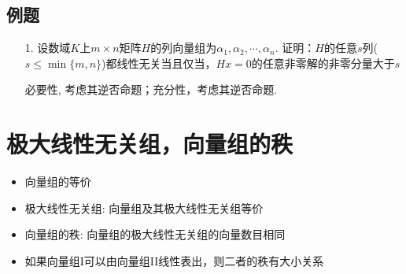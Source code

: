 \subsection*{例题}
\begin{itemize}
	\item[1.] 设数域$K$上$m\times n$矩阵$H$的列向量组为$\alpha_1, \alpha_2, \cdots, \alpha_n$.
	证明：$H$的任意$s$列($s\le \min\{m,n\}$)都线性无关当且仅当，$Hx=0$的任意非零解的非零分量大于$s$
	\begin{solution}
		必要性, 考虑其逆否命题；充分性，考虑其逆否命题.
	\end{solution}
	\vspace{2cm}
\end{itemize}

\section{极大线性无关组，向量组的秩}
\begin{itemize}
	\item 向量组的等价
	\item 极大线性无关组: 向量组及其极大线性无关组等价
	\item 向量组的秩: 向量组的极大线性无关组的向量数目相同
	\item 如果向量组I可以由向量组II线性表出，则二者的秩有大小关系
\end{itemize}

